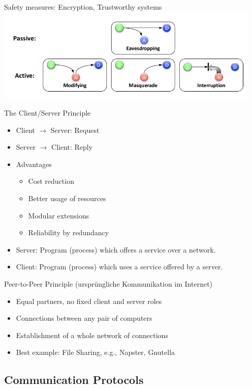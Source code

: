 \documentclass[11pt,ngerman]{article}
\begin{document}
	\noindent	Safety measures: Encryption, Trustworthy	systems	\\
	\includegraphics[width=5in]{images/Selection_005.png}


\noindent The	Client/Server	Principle
\begin{itemize}[noitemsep,nolistsep]
	\item Client $\rightarrow$ Server: Request
	\item Server $\rightarrow$ Client: Reply 
\end{itemize}
\begin{itemize}[noitemsep,nolistsep]
	\item Advantages
	\begin{itemize}[noitemsep,nolistsep]  
	\item Cost	reduction
	\item Better	usage	of	resources
	\item Modular	extensions
	\item Reliability	by	redundancy
	 \end{itemize}
	\item Server: Program	(process)	which	offers	a	service	over	a	network.	
	\item Client: Program	(process)	which	uses	a	service	offered	by	a	server.\\
\end{itemize}


\noindent Peer-to-Peer	Principle (ursprüngliche Kommunikation im Internet)
\begin{itemize}[noitemsep,nolistsep]
	\item Equal	partners,	no	fixed	client	and	server	roles
	\item Connections	between	any	pair	of	computers
	\item Establishment	of	a	whole	network	of	connections
	\item Best	example:	File	Sharing,	e.g.,	Napster,	Gnutella
\end{itemize}

\subsection{Communication	Protocols}
\end{document}
